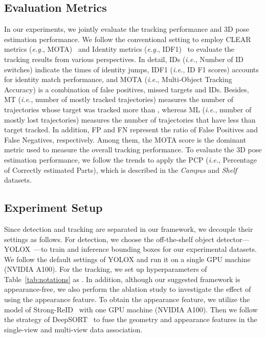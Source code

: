 \documentclass{CVM}
\newcommand{\ie}{{\it i.e.}}
\newcommand{\eg}{{\it e.g.}}
\begin{document}
\subsection{Evaluation Metrics}
In our experiments, we jointly evaluate the tracking performance and 3D pose estimation performance. We follow the conventional setting to employ CLEAR metrics (\eg, MOTA)~\cite{bernardin2008evaluating} and Identity metrics (\eg, IDF1)~\cite{ristani2016performance} to evaluate the tracking results from various perspectives. In detail, IDs (\ie, Number of ID switches) indicate the times of identity jumps, IDF1 (\ie, ID F1 scores) accounts for identity match performance, and MOTA (\ie, Multi-Object Tracking Accuracy) is a combination of false positives, missed targets and IDs. Besides, MT (\ie, number of mostly tracked trajectories) measures the number of trajectories whose target was tracked more than , whereas ML (\ie, number of mostly lost trajectories) measures the number of trajectories that have less than  target tracked. In addition, FP and FN represent the ratio of False Positives and False Negatives, respectively. Among them, the MOTA score is the dominant metric used to measure the overall tracking performance. To evaluate the 3D pose estimation performance, we follow the trends to apply the PCP (\ie, Percentage of Correctly estimated Parts), which is described in the \textit{Campus} and \textit{Shelf}~\cite{fleuret2007multicamera, BelagiannisAASN16} datasets.



\subsection{Experiment Setup}
Since detection and tracking are separated in our framework, we decouple their settings as follows.
For detection, we choose the off-the-shelf object detector---YOLOX~\cite{yolox2021}---to train and inference bounding boxes for our experimental datasets. We follow the default settings of YOLOX and run it on a single GPU machine (NVIDIA A100). For the tracking, we set up hyperparameters of Table~\ref{tab:notations} as .
In addition, although our suggested framework is appearance-free, we also perform the ablation study to investigate the effect of using the appearance feature. To obtain the appearance feature, we utilize the model of Strong-ReID~\cite{Luo_2019_Strong_TMM} with one GPU machine (NVIDIA A100). Then we follow the strategy of DeepSORT~\cite{Wojke2017simple} to fuse the geometry and appearance features in the single-view and multi-view data association. 
\end{document}
